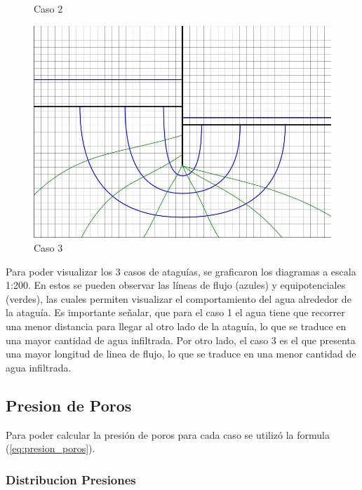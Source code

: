 \begin{figure}[H]
\begin{minipage}{0.32\textwidth}
        \caption{Caso 2}
        \label{fig:caso_2}
    \end{minipage}
    \begin{minipage}{0.32\textwidth}
        \centering
        \includegraphics[width=\textwidth]{GRAFICOS/caso_3.jpg}
        \caption{Caso 3}
        \label{fig:caso_3}
    \end{minipage}
  \end{figure}

Para poder visualizar los 3 casos de ataguías, se graficaron los diagramas a escala 1:200. En estos se pueden observar las líneas de flujo (azules) y equipotenciales (verdes), las cuales permiten visualizar el comportamiento del agua alrededor de la ataguía. Es importante señalar, que para el caso 1 el agua tiene que recorrer una menor distancia para llegar al otro lado de la ataguía, lo que se traduce en una mayor cantidad de agua infiltrada. Por otro lado, el caso 3 es el que presenta una mayor longitud de linea de flujo, lo que se traduce en una menor cantidad de agua infiltrada.

\subsection{Presion de Poros}
Para poder calcular la presión de poros para cada caso se utilizó la formula (\ref{eq:presion_poros}). 
\subsubsection{Distribucion Presiones}

